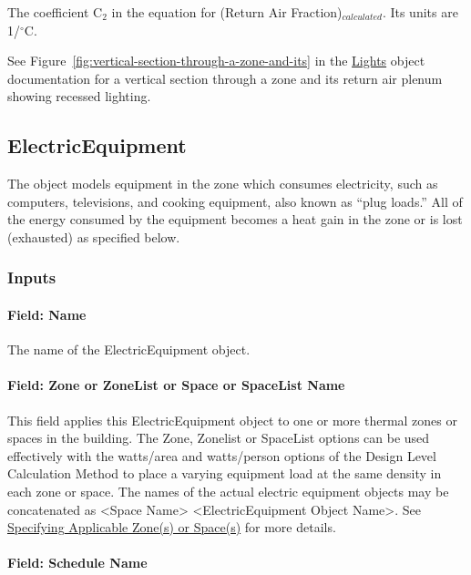 The coefficient C\(_{2}\) in the equation for (Return Air Fraction)\(_{calculated}\). Its units are 1/$^\circ$C.

See Figure~\ref{fig:vertical-section-through-a-zone-and-its} in the \hyperref[lights-000]{Lights} object documentation for a vertical section through a zone and its return air plenum showing recessed lighting.

\subsection{ElectricEquipment}\label{electricequipment}

The object models equipment in the zone which consumes electricity, such as computers, televisions, and cooking equipment, also known as ``plug loads.'' All of the energy consumed by the equipment becomes a heat gain in the zone or is lost (exhausted) as specified below.

\subsubsection{Inputs}\label{inputs-3-019}

\paragraph{Field: Name}\label{field-name-3-017}

The name of the ElectricEquipment object.

\paragraph{Field: Zone or ZoneList or Space or SpaceList Name}\label{eleceq-field-zone-or-zonelist-name-000}

This field applies this ElectricEquipment object to one or more thermal zones or spaces in the building. The Zone, Zonelist or SpaceList options can be used effectively with the watts/area and watts/person options of the Design Level Calculation Method to place a varying equipment load at the same density in each zone or space. The names of the actual electric equipment objects may be concatenated as \textless{}Space Name\textgreater{} \textless{}ElectricEquipment Object Name\textgreater{}. See \hyperref[specifying-applicable-zones-or-spaces]{Specifying Applicable Zone(s) or Space(s)} for more details.

\paragraph{Field: Schedule Name}\label{field-schedule-name-1-001}

